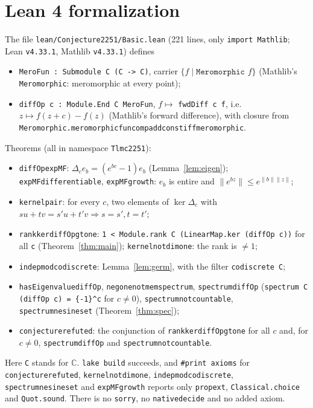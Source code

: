 \documentclass[11pt]{article}
\theoremstyle{definition}
\theoremstyle{remark}
\renewcommand{\_}{\oldus\allowbreak}
\begin{document}
\section{Lean 4 formalization}

The file \texttt{lean/Conjecture2251/Basic.lean} (221 lines, only \texttt{import Mathlib}; Lean
\texttt{v4.33.1}, Mathlib \texttt{v4.33.1}) defines
\begin{itemize}[nosep]
\item \texttt{MeroFun : Submodule C (C -> C)}, carrier $\{f \mid \texttt{Meromorphic } f\}$ (Mathlib's
  \texttt{Meromorphic}: meromorphic at every point);
\item \texttt{diffOp c : Module.End C MeroFun}, $f\mapsto$ \texttt{fwdDiff c f}, i.e.\
  $z\mapsto f(z+c)-f(z)$ (Mathlib's forward difference), with closure from
  \texttt{Meromorphic.meromorphic\_fun\_comp\_add\_const\_iff\_meromorphic}.
\end{itemize}
Theorems (all in namespace \texttt{Tlmc2251}):
\begin{itemize}[nosep]
\item \texttt{diffOp\_expMF}: $\Delta_c e_b=(e^{bc}-1)e_b$ (Lemma~\ref{lem:eigen});
  \texttt{expMF\_differentiable}, \texttt{expMF\_growth}: $e_b$ is entire and $\|e^{bz}\|\le
  e^{\|b\|\|z\|}$;
\item \texttt{kernel\_pair}: for every $c$, two elements of $\ker\Delta_c$ with
  $su+tv=s'u+t'v\Rightarrow s=s',t=t'$;
\item \texttt{rank\_ker\_diffOp\_gt\_one}: \texttt{1 < Module.rank C (LinearMap.ker (diffOp c))} for all
  \texttt{c} (Theorem~\ref{thm:main}); \texttt{kernel\_not\_dim\_one}: the rank is $\ne 1$;
\item \texttt{indep\_mod\_codiscrete}: Lemma~\ref{lem:germ}, with the filter \texttt{codiscrete C};
\item \texttt{hasEigenvalue\_diffOp}, \texttt{neg\_one\_not\_mem\_spectrum}, \texttt{spectrum\_diffOp}
  (\texttt{spectrum C (diffOp c) = \{-1\}\textasciicircum c} for $c\ne0$),
  \texttt{spectrum\_not\_countable}, \texttt{spectrum\_ne\_sine\_set} (Theorem~\ref{thm:spec});
\item \texttt{conjecture\_2251\_refuted}: the conjunction of \texttt{rank\_ker\_diffOp\_gt\_one} for all
  $c$ and, for $c\ne0$, \texttt{spectrum\_diffOp} and \texttt{spectrum\_not\_countable}.
\end{itemize}
Here \texttt{C} stands for $\mathbb{C}$. \texttt{lake build} succeeds, and \texttt{\#print axioms} for
\texttt{conjecture\_2251\_refuted}, \texttt{kernel\_not\_dim\_one}, \texttt{indep\_mod\_codiscrete},
\texttt{spectrum\_ne\_sine\_set} and \texttt{expMF\_growth} reports only \texttt{propext},
\texttt{Classical.choice} and \texttt{Quot.sound}. There is no \texttt{sorry}, no \texttt{native\_decide}
and no added axiom.
\end{document}
